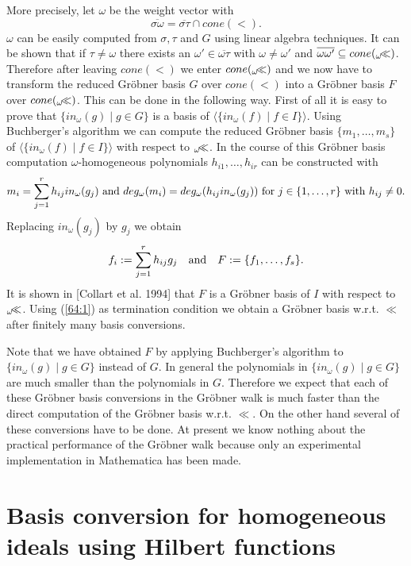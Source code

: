 More precisely, let $\omega$ be the weight vector with 
\[ \overline{\sigma\omega}=\overline{\sigma\tau}\cap cone(<). \]
$\omega$ can be easily computed from $\sigma,\tau$ and $G$ using linear
algebra techniques. It can be shown that if $\tau\not= \omega$ there exists
an $\omega'\in \overline{\omega\tau}$ with $\omega\not=\omega'$ and
$\overline{\omega\omega'}\subseteq cone({_{\omega}\kern-5pt\ll})$. Therefore
after leaving $cone(<)$ we enter $cone({_{\omega}\kern-5pt\ll})$ and we
now have to transform the reduced Gr\"obner basis $G$ over $cone(<)$
into a Gr\"obner basis $F$ over $cone({_{\omega}\kern-5pt\ll})$.
This can be done in the following way.
First of all it is easy to prove that 
$\{in_\omega(g)\mid g\in G\}$ is a
basis of $\langle\{in_{\omega}(f)\mid f\in I\}\rangle$.
Using Buchberger's algorithm we can compute the 
reduced Gr\"obner basis $\{m_1,\ldots,m_s\}$ of 
$\langle\{in_{\omega}(f)\mid f\in I\}\rangle$ 
with 
respect to ${_{\omega}\kern-5pt\ll}$. In the course of this Gr\"obner 
basis computation
$\omega$-homogeneous polynomials $h_{i1},\ldots,h_{ir}$ 
can be constructed
with
\[ m_i=\sum_{j=1}^r h_{ij}in_{\omega}(g_j) \hbox{ and } deg_{\omega}(m_i)=
deg_{\omega}(h_{ij}in_{\omega}(g_j)) \hbox{ for } j\in \{1,\ldots,r\} 
\hbox{ with }
h_{ij}\not= 0. \]
Replacing $in_{\omega}(g_j)$ by $g_j$ we obtain
\[
f_i:=\sum_{j=1}^r h_{ij}g_j \ \ \hbox{ and }\ \ 
F:=\{f_1,\ldots,f_s\}. \]
It is shown in [Collart et al. 1994] that 
$F$ is a Gr\"obner basis of $I$ with 
respect to ${_{\omega}\kern-5pt\ll}$.
Using (\ref{64:1}) as termination condition we obtain a Gr\"obner basis
w.r.t. $\ll$ after finitely many basis conversions.

\smallskip
Note that we have obtained $F$ by applying Buchberger's algorithm to
$\{in_\omega(g)\mid g\in G\}$ instead of $G$. In general the polynomials in 
$\{in_\omega(g)\mid g\in G\}$ are
much smaller than the polynomials in $G$. Therefore we expect that
each of these Gr\"obner basis conversions in the Gr\"obner
walk is much faster than the direct computation of the Gr\"obner basis 
w.r.t. $\ll$. On the other hand several of these conversions have
to be done. 
At present we know nothing about the practical
performance of the Gr\"obner walk
because only an experimental implementation in Mathematica
has been made.


\section{Basis conversion for homogeneous ideals using Hilbert functions}

